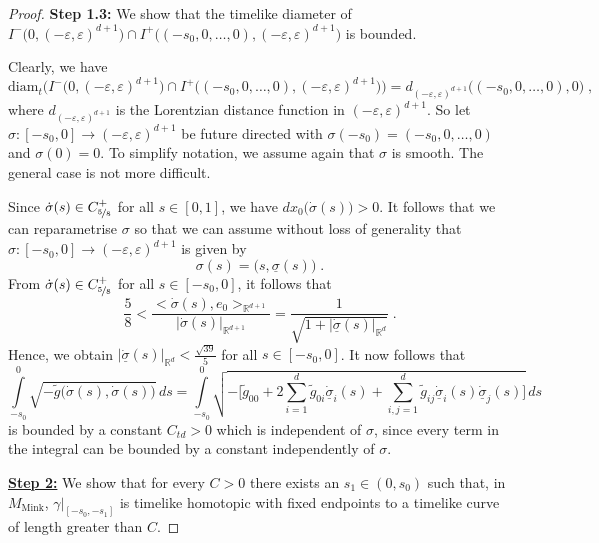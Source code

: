 \documentclass[reqno]{article}
\newcommand{\R}{\mathbb{R}}
\newcommand{\ed}{(-\varepsilon, \varepsilon)^{d+1}}
\newcommand{\diam}{\mathrm{diam}}
\newcommand{\Mmink}{M_{\mathrm{Mink}}}
\begin{document}
\begin{proof}
\textbf{Step 1.3:} We show that the timelike diameter of  $I^-\big(0, \ed\big) \cap I^+\big((-s_0, 0, \ldots, 0), \ed\big)$ is bounded. 
\vspace*{2mm}

Clearly, we have 
\begin{equation*}
\diam_t\Big(I^-\big(0, \ed\big) \cap I^+\big((-s_0, 0, \ldots, 0), \ed\big)\Big) = d_{\ed}\big((-s_0, 0, \ldots, 0),0\big) \;,
\end{equation*}
where $d_{\ed}$ is the Lorentzian distance function in $\ed$.
So let $\sigma :[-s_0,0] \to \ed$ be future directed with $\sigma(-s_0) = (-s_0, 0, \ldots, 0)$ and $\sigma(0) = 0$. To simplify notation, we assume again that $\sigma$ is smooth. The general case is not more difficult. 

Since $\dot{\sigma}(s) \in C^+_{\nicefrac{5}{8}}$ for all $s \in [0,1]$, we have $dx_0\big(\dot{\sigma}(s)\big) >0$. It follows that we can reparametrise $\sigma$ so that we can assume without loss of generality that  $\sigma : [-s_0, 0] \to \ed$ is given by
\begin{equation*}
\sigma(s) = \big(s, \underline{\sigma}(s)\big)\;.
\end{equation*}
From $\dot{\sigma}(s) \in C^+_{\nicefrac{5}{8}}$ for all $s \in [-s_0, 0]$, it follows that
\begin{equation*}
\frac{5}{8} < \frac{<\dot{\sigma}(s), e_0>_{\R^{d+1}}}{|\dot{\sigma}(s)|_{\R^{d+1}}} = \frac{1}{\sqrt{1+ |\dot{\underline{\sigma}}(s)|_{\R^d}}} \;.
\end{equation*}
Hence, we obtain $|\dot{\underline{\sigma}}(s)|_{\R^d} < \frac{\sqrt{39}}{5} $ for all $s \in [-s_0,0]$.
It now follows that
\begin{equation*}
\int\limits_{-s_0}^0 \sqrt{-\tilde{g}\big(\dot{\sigma}(s), \dot{\sigma}(s)\big)} \,ds = \int\limits_{-s_0}^0 \sqrt{ - \Big[ \tilde{g}_{00} + 2\sum_{i=1}^d \tilde{g}_{0i} \dot{\underline{\sigma}}_i(s) + \sum_{i,j =1}^d \tilde{g}_{ij} \dot{\underline{\sigma}}_i(s) \dot{\underline{\sigma}}_j(s) \Big]}\, ds
\end{equation*}
is bounded by a constant $C_{td} >0$ which is independent of $\sigma$, since every term in the integral can be bounded by a constant independently of $\sigma$.
\vspace*{2mm}

\underline{\textbf{Step 2:}} We show that for every $C>0$ there exists an $s_1 \in (0, s_0)$ such that, in $\Mmink$, $\gamma|_{[-s_0, -s_1]}$ is timelike homotopic with fixed endpoints to a timelike curve of length greater than $C$.
\vspace*{2mm}


\end{proof}
\end{document}
